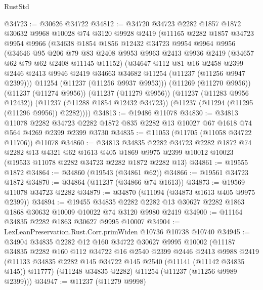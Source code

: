 \begin{lexlean}{RustStd}
\begin{coremodule}
@34723 := @30626 @34722
@34812 := @34720
    @34723
    @2282
    @1857
    @1872
    @30632
    @9968
    @10028
    @74
    @3120
    @9928
    @2419
    (@11165
      @2282
      @1857
      @34723
      @9954
      @9966
      (@34638
        @1854
        @1856
        @12432
        @34723
        @9954
        @9964
        @9956
        (@34646
          @95
          @206
          @79
          @83
          @2408
          @9953
          @9963
          @2413
          @9936
          @2419
          (@34657 @62 @79 @62 @2408 @11145 @11152)
          (@34647
            @112
            @81
            @16
            @2458
            @2399
            @2446
            @2413
            @9946
            @2419
            @34663
            @34682
            @11254
            (@11237 (@11256 @9947 @2399)))
          @11254
          (@11237 (@11256 @9937 @9953)))
        (@11269 (@11270 @9956))
        (@11237 (@11274 @9956))
        (@11237 (@11279 @9956))
        (@11237 (@11283 @9956 @12432))
        (@11237 (@11288 @1854 @12432 @34723))
        (@11237 (@11294 (@11295 (@11296 @9956)) @2282))))
@34813 := @19486 @11078
@34830 := @34813
    @11078
    @2282
    @34723
    @2282
    @1872
    @835
    @2282
    @13
    @10027
    @67
    @1618
    @74
    @564
    @4269
    @2399
    @2399
    @3730
@34835 := @11053 (@11705 (@11058 @34722 @11706)) @11078
@34860 := @34813
    @34835
    @2282
    @34723
    @2282
    @1872
    @74
    @2282
    @13
    @4321
    @62
    @1613
    @405
    @1869
    @9975
    @2399
    @10012
    @10023
    (@19533 @11078 @2282 @34723 @2282 @1872 @2282 @13)
@34861 := @19555 @1872
@34864 := @34860 (@19543 (@34861 @62))
@34866 := @19561 @34723 @1872
@34870 := @34864 (@11237 (@34866 @74 @1613))
@34873 := @19569 @11078 @34723 @2282
@34879 := @34870 (@11094 (@34873 @1613 @405 @9975 @2399))
@34894 := @19455
    @34835
    @2282
    @2282
    @13
    @30627
    @2282
    @1863
    @1868
    @30632
    @10009
    @10022
    @74
    @3120
    @9980
    @2419
@34900 := @11164 @34835 @2282 @1863 @30627 @9995 @10007
@34904 := LexLeanPreservation.Rust.Corr.primWiden @10736 @10738 @10740
@34945 := @34904
    @34835
    @2282
    @12
    @160
    @34722
    @30627
    @9995
    @10002
    (@11187
      @34835
      @2282
      @160
      @112
      @34722
      @16
      @2540
      @2399
      @2446
      @2413
      @9988
      @2419
      (@11133 @34835 @2282 @145 @34722 @145 @2540 (@11141 (@11142 @34835 @145)) @11777)
      (@11248 @34835 @2282)
      @11254
      (@11237 (@11256 @9989 @2399)))
@34947 := @11237 (@11279 @9998)

\end{coremodule}
\end{lexlean}
